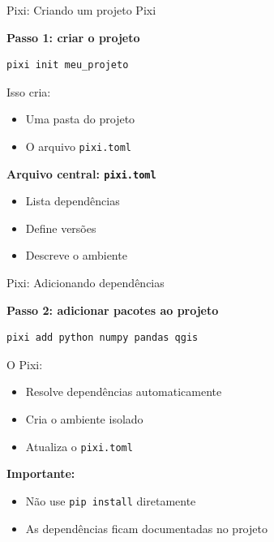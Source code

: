 \documentclass{beamer}
\begin{document}
\begin{frame}[fragile]{Pixi: Criando um projeto Pixi}
    
    \textbf{Passo 1: criar o projeto}
    
    \begin{verbatim}
pixi init meu_projeto
    \end{verbatim}
    
    Isso cria:
    \begin{itemize}
        \item Uma pasta do projeto
        \item O arquivo \texttt{pixi.toml}
    \end{itemize}
    
    \vspace{0.3cm}
    
    \textbf{Arquivo central: \texttt{pixi.toml}}
    \begin{itemize}
        \item Lista dependências
        \item Define versões
        \item Descreve o ambiente
    \end{itemize}
    
\end{frame}

\begin{frame}[fragile]{Pixi: Adicionando dependências}
    
    \textbf{Passo 2: adicionar pacotes ao projeto}
    
    \begin{verbatim}
pixi add python numpy pandas qgis
    \end{verbatim}
    
    O Pixi:
    \begin{itemize}
        \item Resolve dependências automaticamente
        \item Cria o ambiente isolado
        \item Atualiza o \texttt{pixi.toml}
    \end{itemize}
    
    \vspace{0.3cm}
    
    \textbf{Importante:}
    \begin{itemize}
        \item Não use \texttt{pip install} diretamente
        \item As dependências ficam documentadas no projeto
    \end{itemize}
    
\end{frame}
\end{document}
